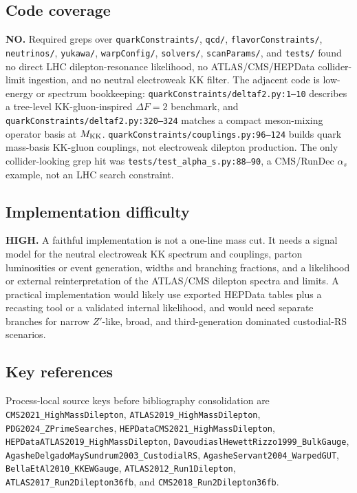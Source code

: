 \subsection*{Code coverage}
\textbf{NO.}  Required greps over \texttt{quarkConstraints/}, \texttt{qcd/},
\texttt{flavorConstraints/}, \texttt{neutrinos/}, \texttt{yukawa/},
\texttt{warpConfig/}, \texttt{solvers/}, \texttt{scanParams/}, and
\texttt{tests/} found no direct LHC dilepton-resonance likelihood, no
ATLAS/CMS/HEPData collider-limit ingestion, and no neutral electroweak KK
filter.  The adjacent code is low-energy or spectrum bookkeeping:
\texttt{quarkConstraints/deltaf2.py:1--10} describes a tree-level
KK-gluon-inspired \(\Delta F=2\) benchmark, and
\texttt{quarkConstraints/deltaf2.py:320--324} matches a compact meson-mixing
operator basis at \(M_{\rm KK}\).  \texttt{quarkConstraints/couplings.py:96--124}
builds quark mass-basis KK-gluon couplings, not electroweak dilepton
production.  The only collider-looking grep hit was
\texttt{tests/test\_alpha\_s.py:88--90}, a CMS/RunDec \(\alpha_s\) example,
not an LHC search constraint.

\subsection*{Implementation difficulty}
\textbf{HIGH.}  A faithful implementation is not a one-line mass cut.  It
needs a signal model for the neutral electroweak KK spectrum and couplings,
parton luminosities or event generation, widths and branching fractions, and
a likelihood or external reinterpretation of the ATLAS/CMS dilepton spectra
and limits.  A practical implementation would likely use exported HEPData
tables plus a recasting tool or a validated internal likelihood, and would
need separate branches for narrow \(Z'\)-like, broad, and third-generation
dominated custodial-RS scenarios.

\subsection*{Key references}
Process-local source keys before bibliography consolidation are
\texttt{CMS2021\_HighMassDilepton},
\texttt{ATLAS2019\_HighMassDilepton},
\texttt{PDG2024\_ZPrimeSearches},
\texttt{HEPDataCMS2021\_HighMassDilepton},
\texttt{HEPDataATLAS2019\_HighMassDilepton},
\texttt{DavoudiaslHewettRizzo1999\_BulkGauge},
\texttt{AgasheDelgadoMaySundrum2003\_CustodialRS},
\texttt{AgasheServant2004\_WarpedGUT},
\texttt{BellaEtAl2010\_KKEWGauge},
\texttt{ATLAS2012\_Run1Dilepton},
\texttt{ATLAS2017\_Run2Dilepton36fb}, and
\texttt{CMS2018\_Run2Dilepton36fb}.

